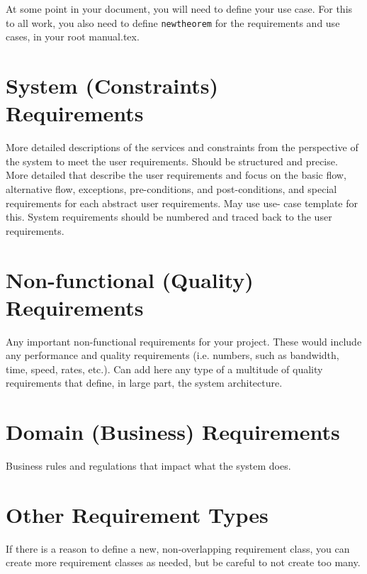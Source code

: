 At some point in your document, you will need to define your use case.
For this to all work, you also need to define {\tt newtheorem} for the requirements and 
use cases, in your root manual.tex.

\section{System (Constraints) Requirements}
More detailed descriptions of the services and constraints from the perspective of the system to
meet the user requirements. Should be structured and precise. More detailed that describe the
user requirements and focus on the basic flow, alternative flow, exceptions, pre-conditions, and
post-conditions, and special requirements for each abstract user requirements. May use use-
case template for this.  System requirements should be numbered and traced back to the user requirements.

\section{Non-functional (Quality) Requirements}
Any important non-functional requirements for your project.  These would include any 
performance and quality requirements (i.e. numbers, such as bandwidth, time, speed, rates, etc.).
Can add here any type of a multitude of quality requirements that define, in large part, the 
system architecture.

\section{Domain (Business) Requirements}
Business rules and regulations that impact what the system does.

\section{Other Requirement Types}
If there is a reason to define a new, non-overlapping requirement class, you can create
more requirement classes as needed, but be careful to not create too many.

